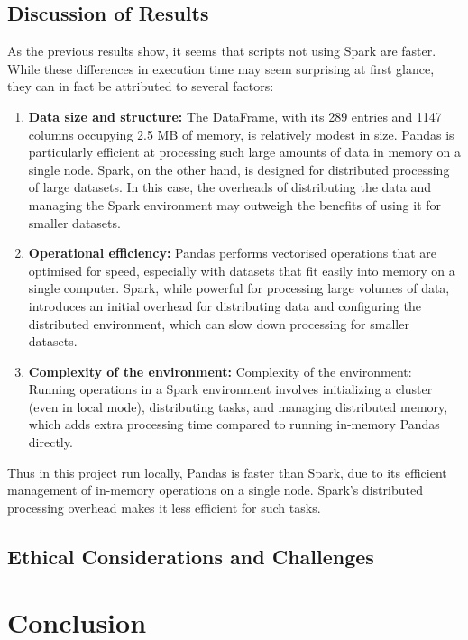 \documentclass[12pt,oneside]{book} %
\begin{document}
\newpage

\section{Discussion of Results}\label{sec:discussion-of-results}
As the previous results show, it seems that scripts not using Spark are faster.
While these differences in execution time may seem surprising at first glance,
they can in fact be attributed to several factors:

\begin{enumerate}
    \item \textbf{Data size and structure:} The DataFrame, with its 289 entries and 1147 columns occupying 2.5 MB of memory, is relatively modest in size. Pandas is particularly efficient at processing such large amounts of data in memory on a single node. Spark, on the other hand, is designed for distributed processing of large datasets. In this case, the overheads of distributing the data and managing the Spark environment may outweigh the benefits of using it for smaller datasets.
    \item \textbf{Operational efficiency:} Pandas performs vectorised operations that are optimised for speed, especially with datasets that fit easily into memory on a single computer. Spark, while powerful for processing large volumes of data, introduces an initial overhead for distributing data and configuring the distributed environment, which can slow down processing for smaller datasets.
    \item \textbf{Complexity of the environment:} Complexity of the environment: Running operations in a Spark environment involves initializing a cluster (even in local mode), distributing tasks, and managing distributed memory, which adds extra processing time compared to running in-memory Pandas directly.
\end{enumerate}

Thus in this project run locally, Pandas is faster than Spark, due to its
efficient management of in-memory operations on a single node. Spark's
distributed processing overhead makes it less efficient for such tasks.

\newpage
\section{Ethical Considerations and Challenges}

\newpage
\chapter{Conclusion}
\end{document}
